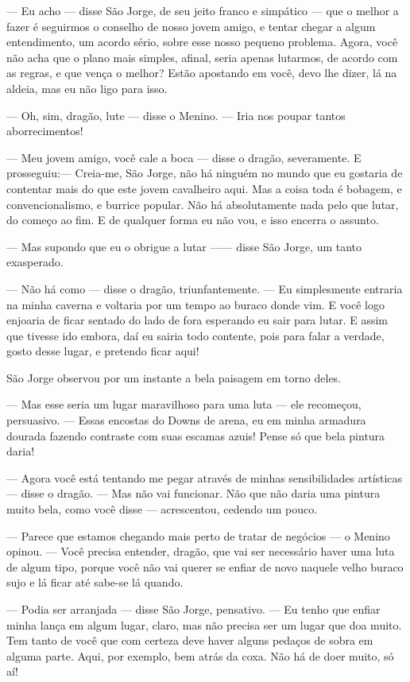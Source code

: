 — Eu acho — disse São Jorge, de seu jeito franco e simpático — que o
melhor a fazer é seguirmos o conselho de nosso jovem amigo, e tentar
chegar a algum entendimento, um acordo sério, sobre esse nosso
pequeno problema. Agora, você não acha que o plano mais simples,
afinal, seria apenas lutarmos, de acordo com as regras, e que vença o
melhor? Estão apostando em você, devo lhe dizer, lá na aldeia, mas eu
não ligo para isso.

— Oh, sim, dragão, lute — disse o Menino. — Iria nos poupar tantos
aborrecimentos!

— Meu jovem amigo, você cale a boca — disse o dragão, severamente. E
prosseguiu:— Creia-me, São Jorge, não há ninguém no mundo que eu
gostaria de contentar mais do que este jovem cavalheiro aqui. Mas a
coisa toda é bobagem, e convencionalismo, e burrice popular. Não há
absolutamente nada pelo que lutar, do começo ao fim. E de qualquer
forma eu não vou, e isso encerra o assunto.

— Mas supondo que eu o obrigue a lutar —— disse São Jorge, um tanto
exasperado.

— Não há como — disse o dragão, triunfantemente. — Eu simplesmente
entraria na minha caverna e voltaria por um tempo ao buraco donde
vim. E você logo enjoaria de ficar sentado do lado de fora esperando
eu sair para lutar. E assim que tivesse ido embora, daí eu sairia
todo contente, pois para falar a verdade, gosto desse lugar, e
pretendo ficar aqui!

São Jorge observou por um instante a bela paisagem em torno deles.

— Mas esse seria um lugar maravilhoso para uma luta — ele recomeçou,
persuasivo. — Essas encostas do Downs de arena, eu em minha armadura
dourada fazendo contraste com suas escamas azuis! Pense só que bela
pintura daria!

— Agora você está tentando me pegar através de minhas sensibilidades
artísticas — disse o dragão. — Mas não vai funcionar. Não que não
daria uma pintura muito bela, como você disse — acrescentou, cedendo
um pouco.

— Parece que estamos chegando mais perto de tratar de negócios — o
Menino opinou. — Você precisa entender, dragão, que vai ser
necessário haver uma luta de algum tipo, porque você não vai querer
se enfiar de novo naquele velho buraco sujo e lá ficar até sabe-se lá
quando.

— Podia ser arranjada — disse São Jorge, pensativo. — Eu tenho que
enfiar minha lança em algum lugar, claro, mas não precisa ser um
lugar que doa muito. Tem tanto de você que com certeza deve haver
alguns pedaços de sobra em alguma parte. Aqui, por exemplo, bem atrás
da coxa. Não há de doer muito, só aí!

